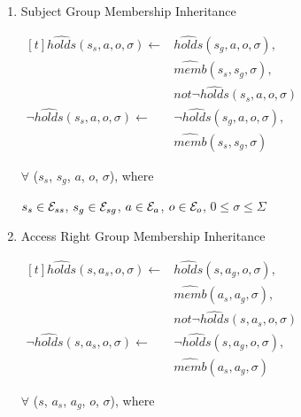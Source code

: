 \documentclass[10pt, twocolumn]{article}
\begin{document}
            \begin{enumerate}
              \item
                Subject Group Membership Inheritance

                \begin{math}
                  \begin{aligned}[t]
                    \hat{holds}(s_{s}, a, o, \sigma) \leftarrow &
                    \hat{holds}(s_{g}, a, o, \sigma), \\
                    & \hat{memb}(s_{s}, s_{g}, \sigma), \\
                    & not \lnot \hat{holds}(s_{s}, a, o, \sigma) \\
                    \lnot \hat{holds}(s_{s}, a, o, \sigma) \leftarrow &
                    \lnot \hat{holds}(s_{g}, a, o, \sigma), \\
                    & \hat{memb}(s_{s}, s_{g}, \sigma)
                  \end{aligned}
                \end{math}

                $\forall$ ($s_{s}$, $s_{g}$, $a$, $o$, $\sigma$), where

                $s_{s} \in {\cal E}_{ss}$,
                $s_{g} \in {\cal E}_{sg}$,
                $a \in {\cal E}_{a}$,
                $o \in {\cal E}_{o}$,
                $0 \leq \sigma \leq \Sigma$

              \item
                Access Right Group Membership Inheritance

                \begin{math}
                  \begin{aligned}[t]
                    \hat{holds}(s, a_{s}, o, \sigma) \leftarrow &
                    \hat{holds}(s, a_{g}, o, \sigma), \\
                    & \hat{memb}(a_{s}, a_{g}, \sigma), \\
                    & not \lnot \hat{holds}(s, a_{s}, o, \sigma) \\
                    \lnot \hat{holds}(s, a_{s}, o, \sigma) \leftarrow &
                    \lnot \hat{holds}(s, a_{g}, o, \sigma), \\
                    & \hat{memb}(a_{s}, a_{g}, \sigma)
                  \end{aligned}
                \end{math}

                $\forall$ ($s$, $a_{s}$, $a_{g}$, $o$, $\sigma$), where


\end{enumerate}
\end{document}
